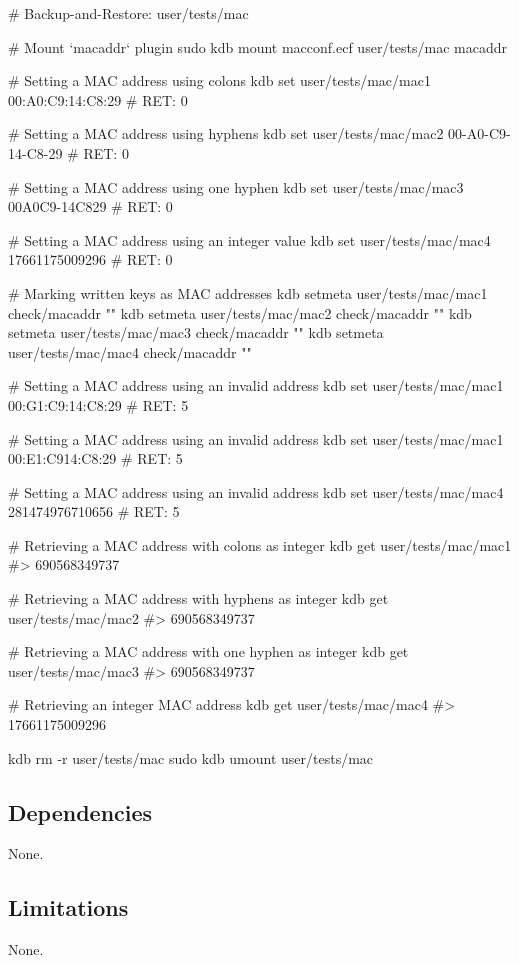 \begin{DoxyCode}
# Backup-and-Restore: user/tests/mac

# Mount `macaddr` plugin
sudo kdb mount macconf.ecf user/tests/mac macaddr

# Setting a MAC address using colons
kdb set user/tests/mac/mac1 00:A0:C9:14:C8:29
# RET: 0

# Setting a MAC address using hyphens
kdb set user/tests/mac/mac2 00-A0-C9-14-C8-29
# RET: 0

# Setting a MAC address using one hyphen
kdb set user/tests/mac/mac3 00A0C9-14C829
# RET: 0

# Setting a MAC address using an integer value
kdb set user/tests/mac/mac4 17661175009296
# RET: 0

# Marking written keys as MAC addresses
kdb setmeta user/tests/mac/mac1 check/macaddr ""
kdb setmeta user/tests/mac/mac2 check/macaddr ""
kdb setmeta user/tests/mac/mac3 check/macaddr ""
kdb setmeta user/tests/mac/mac4 check/macaddr ""

# Setting a MAC address using an invalid address
kdb set user/tests/mac/mac1 00:G1:C9:14:C8:29
# RET: 5

# Setting a MAC address using an invalid address
kdb set user/tests/mac/mac1 00:E1:C914:C8:29
# RET: 5

# Setting a MAC address using an invalid address
kdb set user/tests/mac/mac4 281474976710656
# RET: 5

# Retrieving a MAC address with colons as integer
kdb get user/tests/mac/mac1
#> 690568349737

# Retrieving a MAC address with hyphens as integer
kdb get user/tests/mac/mac2
#> 690568349737

# Retrieving a MAC address with one hyphen as integer
kdb get user/tests/mac/mac3
#> 690568349737

# Retrieving an integer MAC address
kdb get user/tests/mac/mac4
#> 17661175009296

kdb rm -r user/tests/mac
sudo kdb umount user/tests/mac
\end{DoxyCode}


\subsection*{Dependencies}

None.

\subsection*{Limitations}

None. 